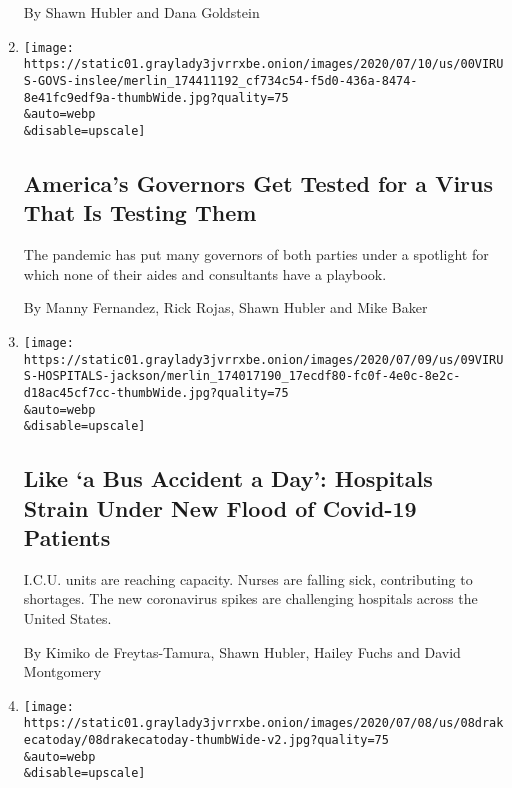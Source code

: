 \begin{enumerate}
  By Shawn Hubler and Dana Goldstein
\item
  \href{/2020/07/13/us/coronavirus-governors.html}{}

  \texttt{[image: https://static01.graylady3jvrrxbe.onion/images/2020/07/10/us/00VIRUS-GOVS-inslee/merlin\_174411192\_cf734c54-f5d0-436a-8474-8e41fc9edf9a-thumbWide.jpg?quality=75\\\&auto=webp\\\&disable=upscale]}

  \hypertarget{americas-governors-get-tested-for-a-virus-that-is-testing-them}{%
  \subsection{America's Governors Get Tested for a Virus That Is Testing
  Them}\label{americas-governors-get-tested-for-a-virus-that-is-testing-them}}

  The pandemic has put many governors of both parties under a spotlight
  for which none of their aides and consultants have a playbook.

  By Manny Fernandez, Rick Rojas, Shawn Hubler and Mike Baker
\item
  \href{/2020/07/09/us/coronavirus-hospitals-capacity.html}{}

  \texttt{[image: https://static01.graylady3jvrrxbe.onion/images/2020/07/09/us/09VIRUS-HOSPITALS-jackson/merlin\_174017190\_17ecdf80-fc0f-4e0c-8e2c-d18ac45cf7cc-thumbWide.jpg?quality=75\\\&auto=webp\\\&disable=upscale]}

  \hypertarget{like-a-bus-accident-a-day-hospitals-strain-under-new-flood-of-covid-19-patients}{%
  \subsection{Like `a Bus Accident a Day': Hospitals Strain Under New
  Flood of Covid-19
  Patients}\label{like-a-bus-accident-a-day-hospitals-strain-under-new-flood-of-covid-19-patients}}

  I.C.U. units are reaching capacity. Nurses are falling sick,
  contributing to shortages. The new coronavirus spikes are challenging
  hospitals across the United States.

  By Kimiko de Freytas-Tamura, Shawn Hubler, Hailey Fuchs and David
  Montgomery
\item
  \href{/2020/07/08/us/new-university-california-president-michael-drake.html}{}

  \texttt{[image: https://static01.graylady3jvrrxbe.onion/images/2020/07/08/us/08drakecatoday/08drakecatoday-thumbWide-v2.jpg?quality=75\\\&auto=webp\\\&disable=upscale]}


\end{enumerate}
